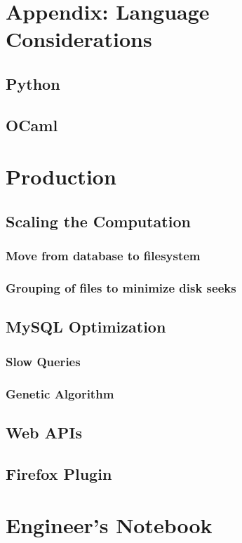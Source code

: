 \chapter{Appendix: Language Considerations}
    \section{Python}
    \section{OCaml}
\chapter{Production}
    \section{Scaling the Computation}
        \subsection{Move from database to filesystem}
        \subsection{Grouping of files to minimize disk seeks}
    \section{MySQL Optimization}
        \subsection{Slow Queries}
        \subsection{Genetic Algorithm}
    \section{Web APIs}
    \section{Firefox Plugin}
\chapter{Engineer's Notebook}


